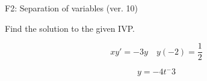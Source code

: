 \begin{exercise}
  \begin{exerciseTitle}F2: Separation of variables (ver. 10)\end{exerciseTitle}
  \begin{exerciseStatement}
    
Find the solution to the given IVP.

    
\[xy'= -3 y \hspace{1em} y( -2 ) = \frac{1}{2}\]

  \end{exerciseStatement}
  \begin{exerciseAnswer}
    
\[y= -4 t^ -3\]

  \end{exerciseAnswer}
\end{exercise}